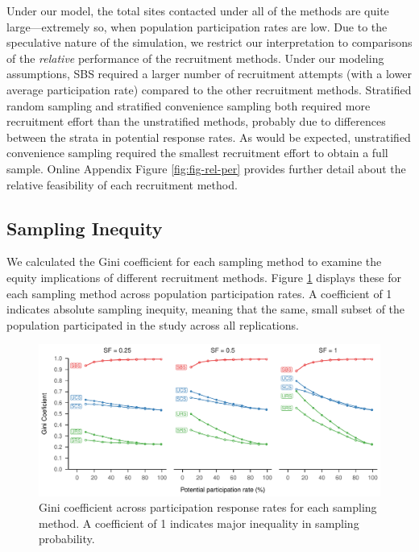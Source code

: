 \documentclass[
  english,
  man,floatsintext]{apa6}
\begin{document}
Under our model, the total sites contacted under all of the methods are quite large---extremely so, when population participation rates are low. Due to the speculative nature of the simulation, we restrict our interpretation to comparisons of the \emph{relative} performance of the recruitment methods. Under our modeling assumptions, SBS required a larger number of recruitment attempts (with a lower average participation rate) compared to the other recruitment methods. Stratified random sampling and stratified convenience sampling both required more recruitment effort than the unstratified methods, probably due to differences between the strata in potential response rates.
As would be expected, unstratified convenience sampling required the smallest recruitment effort to obtain a full sample. Online Appendix Figure \ref{fig:fig-rel-per} provides further detail about the relative feasibility of each recruitment method.

\hypertarget{sampling-inequity-1}{%
\subsection*{Sampling Inequity}\label{sampling-inequity-1}}

We calculated the Gini coefficient for each sampling method to examine the equity implications of different recruitment methods. Figure \ref{fig:fig-gini} displays these for each sampling method across population participation rates. A coefficient of 1 indicates absolute sampling inequity, meaning that the same, small subset of the population participated in the study across all replications.



\begin{figure}
\centering
\includegraphics{6---Paper_files/figure-latex/fig-gini-1.pdf}
\caption{\label{fig:fig-gini}Gini coefficient across participation response rates for each sampling method. A coefficient of 1 indicates major inequality in sampling probability.}
\end{figure}
\end{document}
